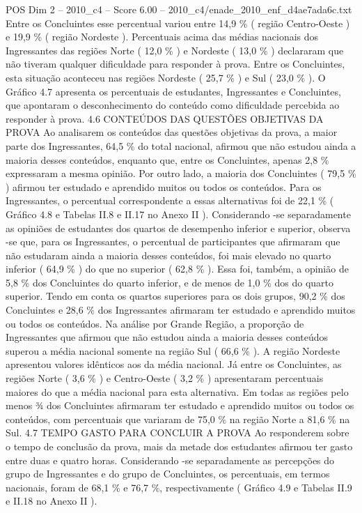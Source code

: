 \begin{textsample}{POS Dim 2 – 2010\_c4 – Score 6.00 – 2010\_c4/enade\_2010\_enf\_d4ae7ada6c.txt}
Entre os Concluintes esse percentual variou entre 14,9 \% ( região Centro-Oeste ) e 19,9 \% ( região Nordeste ).
Percentuais acima das médias nacionais dos Ingressantes das regiões Norte ( 12,0 \% ) e Nordeste ( 13,0 \% ) declararam que não tiveram qualquer dificuldade para responder à prova.
Entre os Concluintes, esta situação aconteceu nas regiões Nordeste ( 25,7 \% ) e Sul ( 23,0 \% ).
O Gráfico 4.7 apresenta os percentuais de estudantes, Ingressantes e Concluintes, que apontaram o desconhecimento do conteúdo como dificuldade percebida ao responder à prova. 4.6 CONTEÚDOS DAS QUESTÕES OBJETIVAS DA PROVA Ao analisarem os conteúdos das questões objetivas da prova, a maior parte dos Ingressantes, 64,5 \% do total nacional, afirmou que não estudou ainda a maioria desses conteúdos, enquanto que, entre os Concluintes, apenas 2,8 \% expressaram a mesma opinião.
Por outro lado, a maioria dos Concluintes ( 79,5 \% ) afirmou ter estudado e aprendido muitos ou todos os conteúdos.
Para os Ingressantes, o percentual correspondente a essas alternativas foi de 22,1 \% ( Gráfico 4.8 e Tabelas II.8 e II.17 no Anexo II ).
Considerando -se separadamente as opiniões de estudantes dos quartos de desempenho inferior e superior, observa -se que, para os Ingressantes, o percentual de participantes que afirmaram que não estudaram ainda a maioria desses conteúdos, foi mais elevado no quarto inferior ( 64,9 \% ) do que no superior ( 62,8 \% ).
Essa foi, também, a opinião de 5,8 \% dos Concluintes do quarto inferior, e de menos de 1,0 \% dos do quarto superior.
Tendo em conta os quartos superiores para os dois grupos, 90,2 \% dos Concluintes e 28,6 \% dos Ingressantes afirmaram ter estudado e aprendido muitos ou todos os conteúdos.
Na análise por Grande Região, a proporção de Ingressantes que afirmou que não estudou ainda a maioria desses conteúdos superou a média nacional somente na região Sul ( 66,6 \% ).
A região Nordeste apresentou valores idênticos aos da média nacional.
Já entre os Concluintes, as regiões Norte ( 3,6 \% ) e Centro-Oeste ( 3,2 \% ) apresentaram percentuais maiores do que a média nacional para esta alternativa.
Em todas as regiões pelo menos ¾ dos Concluintes afirmaram ter estudado e aprendido muitos ou todos os conteúdos, com percentuais que variaram de 75,0 \% na região Norte a 81,6 \% na Sul. 4.7 TEMPO GASTO PARA CONCLUIR A PROVA Ao responderem sobre o tempo de conclusão da prova, mais da metade dos estudantes afirmou ter gasto entre duas e quatro horas.
Considerando -se separadamente as percepções do grupo de Ingressantes e do grupo de Concluintes, os percentuais, em termos nacionais, foram de 68,1 \% e 76,7 \%, respectivamente ( Gráfico 4.9 e Tabelas II.9 e II.18 no Anexo II ).

\end{textsample}
